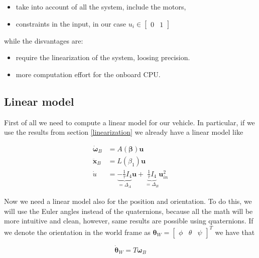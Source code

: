 \begin{itemize}
	\item take into account of all the system, include the motors,
	\item constraints in the input, in our case $u_{i} \in \begin{bmatrix}0 & 1 \end{bmatrix}$
\end{itemize}

\noindent while the disvantages are:

\begin{itemize}
	\item require the linearization of the system, loosing precision.
	\item more computation effort for the onboard CPU.
\end{itemize}

\subsection{Linear model}

First of all we need to compute a linear model for our vehicle. In particular, if we use the results from section \ref{linearization} we already have a linear model like

\begin{align}
	\dot{\boldsymbol{\omega}}_B &= A(\boldsymbol{\beta})\mathbf{u} \label{eq:MPCdyn1} \\
	\ddot{\mathbf{x}}_B &= L(\beta_1)\mathbf{u} \label{eq:MPCdyn2} \\
	\dot{u} &= \underbrace{-\frac{1}{\tau}I_4}_{=\Delta_A}\mathbf{u} + \underbrace{\frac{1}{\tau}I_4}_{=\Delta_B}\mathbf{u}_{in}^2 \label{eq:MPCdyn3}
\end{align}

\noindent Now we need a linear model also for the position and orientation. To do this, we will use the Euler angles instead of the quaternions, because all the math will be more intuitive and clean, however, same results are possible using quaternions. If we denote the orientation in the world frame as $\boldsymbol{\theta}_W = \begin{bmatrix} \phi & \theta & \psi \end{bmatrix}^T$ we have that

\begin{equation}
	\dot{\boldsymbol{\theta}}_W = T\boldsymbol{\omega}_B
	\label{eq:thetaDynamic}
\end{equation}

